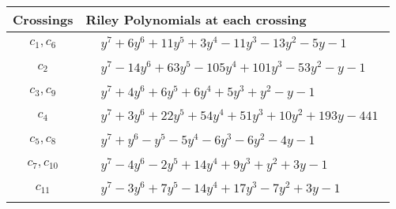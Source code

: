\documentclass[1p]{elsarticle_modified}
\theoremstyle{definition}
\begin{document}
\begin{tabular}{m{50pt}|m{274pt}}
Crossings & \hspace{64pt}Riley Polynomials at each crossing \\
\hline $$\begin{aligned}c_{1},c_{6}\end{aligned}$$&$\begin{aligned}
&y^7+6 y^6+11 y^5+3 y^4-11 y^3-13 y^2-5 y-1
\end{aligned}$\\
\hline $$\begin{aligned}c_{2}\end{aligned}$$&$\begin{aligned}
&y^7-14 y^6+63 y^5-105 y^4+101 y^3-53 y^2- y-1
\end{aligned}$\\
\hline $$\begin{aligned}c_{3},c_{9}\end{aligned}$$&$\begin{aligned}
&y^7+4 y^6+6 y^5+6 y^4+5 y^3+y^2- y-1
\end{aligned}$\\
\hline $$\begin{aligned}c_{4}\end{aligned}$$&$\begin{aligned}
&y^7+3 y^6+22 y^5+54 y^4+51 y^3+10 y^2+193 y-441
\end{aligned}$\\
\hline $$\begin{aligned}c_{5},c_{8}\end{aligned}$$&$\begin{aligned}
&y^7+y^6- y^5-5 y^4-6 y^3-6 y^2-4 y-1
\end{aligned}$\\
\hline $$\begin{aligned}c_{7},c_{10}\end{aligned}$$&$\begin{aligned}
&y^7-4 y^6-2 y^5+14 y^4+9 y^3+y^2+3 y-1
\end{aligned}$\\
\hline $$\begin{aligned}c_{11}\end{aligned}$$&$\begin{aligned}
&y^7-3 y^6+7 y^5-14 y^4+17 y^3-7 y^2+3 y-1
\end{aligned}$\\
\hline
\end{tabular}\\~\\
\end{document}
